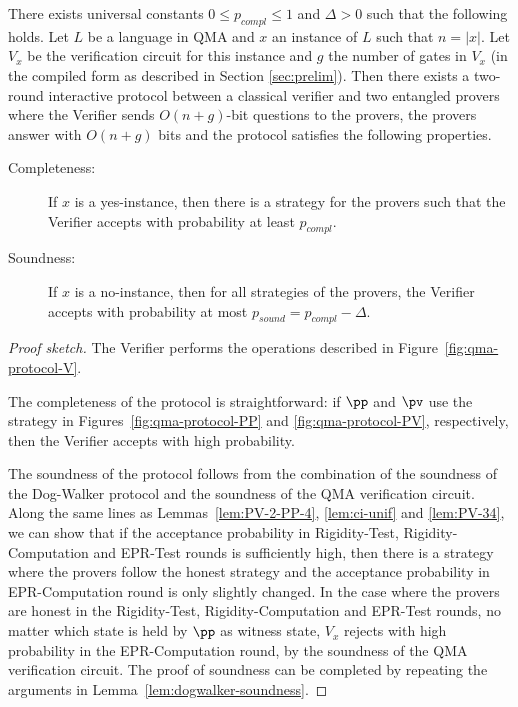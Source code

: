 \begin{lemma}
There
  exists universal constants $0\leq p_{compl}\leq 1$ and $\Delta >0$ such that the following holds. 
Let $L$ be a language in QMA and $x$ an instance of $L$ such that $n = |x|$. Let  $V_x$ be the
  verification circuit for this instance and $g$ the number of gates in $V_x$
  (in the compiled form as described in Section \ref{sec:prelim}). Then there exists a two-round interactive protocol
between a classical verifier and two entangled provers where the Verifier
sends  $O(n + g)$-bit questions to the provers, the provers answer with $O(n + g)$ bits and the protocol satisfies the following properties.
\begin{description}
\item[Completeness:] If $x$ is a yes-instance, then  there is a strategy for the provers such that the Verifier accepts with probability  at least $p_{compl}$.
\item[Soundness:] If $x$ is a no-instance, then for all strategies of the provers, the Verifier accepts with  probability at most
$p_{sound} = p_{compl} - \Delta$.
\end{description}
\end{lemma}
\begin{proof}[Proof sketch]
The Verifier performs the operations described in Figure~\ref{fig:qma-protocol-V}. 

  The completeness of the protocol is straightforward: if $\pp$ and $\pv$ use the strategy in Figures~\ref{fig:qma-protocol-PP} and \ref{fig:qma-protocol-PV}, respectively, then the Verifier accepts with  high probability.

  The soundness of the protocol follows from the combination of the soundness of the
  Dog-Walker protocol and the soundness of the QMA verification circuit. Along the same lines as 
  Lemmas~\ref{lem:PV-2-PP-4}, \ref{lem:ci-unif} and \ref{lem:PV-34},
  we can show that if
  the acceptance probability in Rigidity-Test, Rigidity-Computation and
  EPR-Test rounds
  is sufficiently high, then there is a strategy where the provers follow the honest
  strategy and the acceptance probability in EPR-Computation round is only slightly
  changed.  
  In the case where the provers are honest in the Rigidity-Test, Rigidity-Computation and EPR-Test rounds, no matter which state is held
  by $\pp$ as witness state, $V_x$ rejects with high probability in the EPR-Computation round, by the
  soundness of the QMA verification circuit.  The proof of soundness can be completed by repeating the
  arguments in Lemma~\ref{lem:dogwalker-soundness}.
\end{proof}



